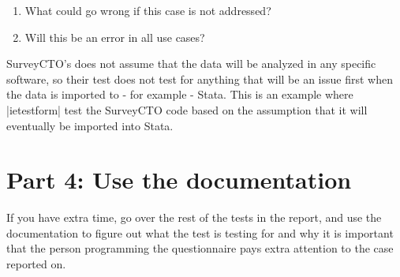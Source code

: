 \documentclass{tufte-handout}
\begin{document}
	\begin{enumerate}
		\item What could go wrong if this case is not addressed?   
		\item Will this be an error in all use cases? 
	\end{enumerate}

	SurveyCTO's does not assume that the data will be analyzed in any specific software, so their test does not test for anything that will be an issue first when the data is imported to - for example - Stata. This is an example where |ietestform| test the SurveyCTO code based on the assumption that it will eventually be imported into Stata.

\section{Part 4: Use the documentation}
If you have extra time, go over the rest of the tests in the report, and use the documentation to figure out what the test is testing for and why it is important that the person programming the questionnaire pays extra attention to the case reported on. 
\end{document}
